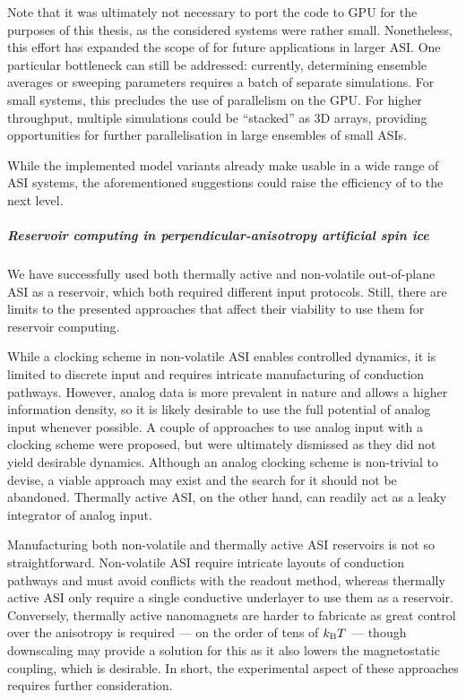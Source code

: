 Note that it was ultimately not necessary to port the code to GPU for the purposes of this thesis, as the considered systems were rather small. %
Nonetheless, this effort has expanded the scope of \hotspice for future applications in larger ASI.
One particular bottleneck can still be addressed: currently, determining ensemble averages or sweeping parameters requires a batch of separate simulations.
For small systems, this precludes the use of parallelism on the GPU.
For higher throughput, multiple simulations could be ``stacked'' as 3D arrays, providing opportunities for further parallelisation in large ensembles of small ASIs. \\\par %

While the implemented model variants already make \hotspice usable in a wide range of ASI systems, the aforementioned suggestions could raise the efficiency of \hotspice to the next level.

\subparagraph{Reservoir computing in perpendicular-anisotropy artificial spin ice}
We have successfully used both thermally active and non-volatile out-of-plane ASI as a reservoir, which both required different input protocols.
Still, there are limits to the presented approaches that affect their viability to use them for reservoir computing. \par

While a clocking scheme in non-volatile ASI enables controlled dynamics, it is limited to discrete input and requires intricate manufacturing of conduction pathways.
However, analog data is more prevalent in nature and allows a higher information density, so it is likely desirable to use the full potential of analog input whenever possible.
A couple of approaches to use analog input with a clocking scheme were proposed, but were ultimately dismissed as they did not yield desirable dynamics.
Although an analog clocking scheme is non-trivial to devise, a viable approach may exist and the search for it should not be abandoned.
Thermally active ASI, on the other hand, can readily act as a leaky integrator of analog input. \par
Manufacturing both non-volatile and thermally active ASI reservoirs is not so straightforward.
Non-volatile ASI require intricate layouts of conduction pathways and must avoid conflicts with the readout method, whereas thermally active ASI only require a single conductive underlayer to use them as a reservoir.
Conversely, thermally active nanomagnets are harder to fabricate as great control over the anisotropy is required --- on the order of tens of $\kBT$ --- though downscaling may provide a solution for this as it also lowers the magnetostatic coupling, which is desirable.
In short, the experimental aspect of these approaches requires further consideration. \\\par

